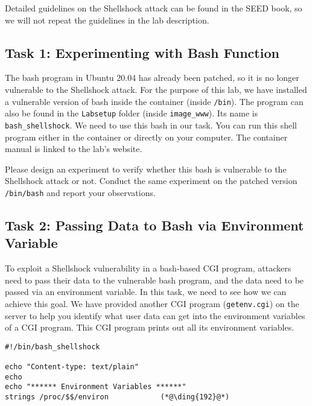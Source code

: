 Detailed guidelines on the Shellshock attack can be found in the SEED book, so we will not 
repeat the guidelines in the lab description. 

\subsection{Task 1: Experimenting with Bash Function}


The bash program in Ubuntu 20.04 has already been patched, so it is no
longer vulnerable to the Shellshock attack. For the purpose of this lab, we
have installed a vulnerable version of bash inside the container (inside \texttt{/bin}). 
The program can also be found in the \texttt{Labsetup} folder (inside \texttt{image\_www}). 
Its name is \texttt{bash\_shellshock}. We need to use 
this bash in our task. You can run this shell program either in the 
container or directly on your computer. 
The container manual is linked to the lab's website. 

Please design an experiment to verify whether this bash is
vulnerable to the Shellshock attack or not. 
Conduct the same experiment on the patched version 
\texttt{/bin/bash} and report your observations.


\subsection{Task 2: Passing Data to Bash via Environment Variable}


To exploit a Shellshock vulnerability in a bash-based CGI program, attackers need to 
pass their data to the vulnerable bash program, and the data need to be
passed via an environment variable. In this task, we need to see how we can
achieve this goal. We have provided another CGI program (\texttt{getenv.cgi}) on the 
server to help you identify what user data can get into the environment
variables of a CGI program. This CGI program prints out all
its environment variables. 


\begin{lstlisting}[caption=\texttt{getenv.cgi}]
#!/bin/bash_shellshock             

echo "Content-type: text/plain"
echo
echo "****** Environment Variables ******"
strings /proc/$$/environ            (*@\ding{192}@*)
\end{lstlisting}

